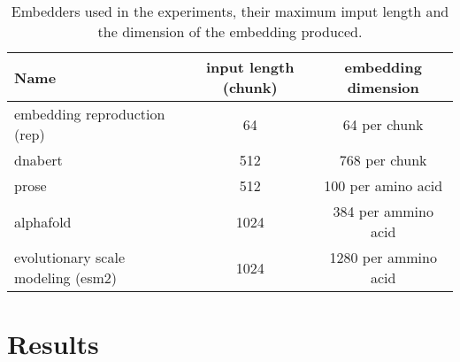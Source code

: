 \documentclass[12pt, letterpaper, twocolumn]{article}
\begin{document}
\onecolumn
\begin{table}[h]
\centering
\begin{tabular}{|l c c|} 
    \hline
    Name & input length (chunk) & embedding dimension  \\ 
    \hline
    embedding reproduction (rep)\cite{yang2018learned}       & 64    & 64 per chunk   \\
    dnabert \cite{ji2021dnabert}                     & 512     & 768 per chunk \\
    prose   \cite{bepler2021learning}                   & 512   & 100 per amino acid   \\
    alphafold  \cite{jumper2021highly}                 & 1024   & 384 per ammino acid\\
    evolutionary scale modeling (esm2) \cite{lin2022language}   & 1024    & 1280 per ammino acid \\  
    \hline
\end{tabular}
\caption{Embedders used in the experiments, their maximum imput length and the dimension of the embedding produced.}
\label{table:data}
\end{table}
\twocolumn

\section{Results}

\onecolumn
\newpage
\FloatBarrier


\end{document}
